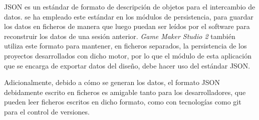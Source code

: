 JSON es un estándar de formato de descripción de objetos para el intercambio de datos.
se ha empleado este estándar en los módulos de persistencia, para guardar los datos en ficheros de manera que luego puedan ser leídos por el software para reconstruir los datos de una sesión anterior.
\textit{Game Maker Studio 2} también utiliza este formato para mantener, en ficheros separados, la persistencia de los proyectos desarrollados con dicho motor, por lo que el módulo de esta aplicación que se encarga de exportar datos del diseño, debe hacer uso del estándar JSON.

Adicionalmente, debido a cómo se generan los datos, el formato JSON debidamente escrito en ficheros es amigable tanto para los desarrolladores, que pueden leer ficheros escritos en dicho formato, como con tecnologías como git para el control de versiones.